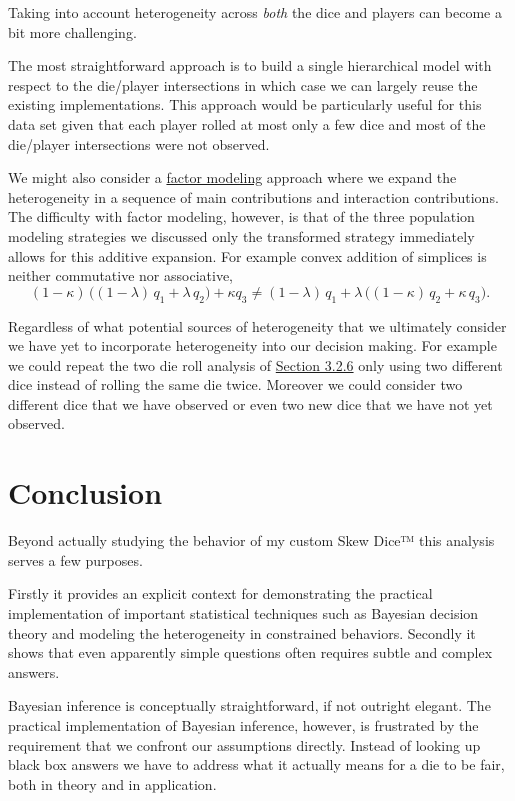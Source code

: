\documentclass[
  letterpaper,
  DIV=11,
  numbers=noendperiod]{scrartcl}
\begin{document}
Taking into account heterogeneity across \emph{both} the dice and
players can become a bit more challenging.

The most straightforward approach is to build a single hierarchical
model with respect to the die/player intersections in which case we can
largely reuse the existing implementations. This approach would be
particularly useful for this data set given that each player rolled at
most only a few dice and most of the die/player intersections were not
observed.

We might also consider a
\href{https://betanalpha.github.io/assets/case_studies/factor_modeling.html}{factor
modeling} approach where we expand the heterogeneity in a sequence of
main contributions and interaction contributions. The difficulty with
factor modeling, however, is that of the three population modeling
strategies we discussed only the transformed strategy immediately allows
for this additive expansion. For example convex addition of simplices is
neither commutative nor associative, \[
(1 - \kappa) \, \big( (1 - \lambda) \, q_{1} + \lambda \, q_{2} \big)
+ \kappa q_{3}
\ne
(1 - \lambda) \, q_{1}
+ \lambda \, \big( (1 - \kappa) \, q_{2} + \kappa \, q_{3} ).
\]

Regardless of what potential sources of heterogeneity that we ultimately
consider we have yet to incorporate heterogeneity into our decision
making. For example we could repeat the two die roll analysis of
\href{@sec:effective_pushforward}{Section 3.2.6} only using two
different dice instead of rolling the same die twice. Moreover we could
consider two different dice that we have observed or even two new dice
that we have not yet observed.

\section{Conclusion}\label{conclusion}

Beyond actually studying the behavior of my custom Skew Dice™ this
analysis serves a few purposes.

Firstly it provides an explicit context for demonstrating the practical
implementation of important statistical techniques such as Bayesian
decision theory and modeling the heterogeneity in constrained behaviors.
Secondly it shows that even apparently simple questions often requires
subtle and complex answers.

Bayesian inference is conceptually straightforward, if not outright
elegant. The practical implementation of Bayesian inference, however, is
frustrated by the requirement that we confront our assumptions directly.
Instead of looking up black box answers we have to address what it
actually means for a die to be fair, both in theory and in application.
\end{document}
